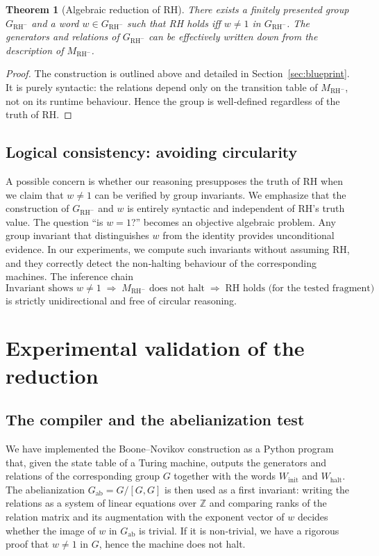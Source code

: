 \documentclass[11pt,a4paper]{article}
\newtheorem{theorem}{Theorem}[section]
\begin{document}
\begin{theorem}[Algebraic reduction of RH]\label{thm:reduction}
There exists a finitely presented group \(G_{\text{RH}^-}\) and a word \(w \in G_{\text{RH}^-}\) such that RH holds iff \(w \neq 1\) in \(G_{\text{RH}^-}\). The generators and relations of \(G_{\text{RH}^-}\) can be effectively written down from the description of \(M_{\text{RH}^-}\).
\end{theorem}
\begin{proof}
The construction is outlined above and detailed in Section~\ref{sec:blueprint}. It is purely syntactic: the relations depend only on the transition table of \(M_{\text{RH}^-}\), not on its runtime behaviour. Hence the group is well‑defined regardless of the truth of RH.
\end{proof}

\subsection{Logical consistency: avoiding circularity}
A possible concern is whether our reasoning presupposes the truth of RH when we claim that \(w \neq 1\) can be verified by group invariants. We emphasize that the construction of \(G_{\text{RH}^-}\) and \(w\) is entirely syntactic and independent of RH's truth value. The question ``is \(w = 1\)?'' becomes an objective algebraic problem. Any group invariant that distinguishes \(w\) from the identity provides unconditional evidence. In our experiments, we compute such invariants without assuming RH, and they correctly detect the non‑halting behaviour of the corresponding machines. The inference chain
\[
\text{Invariant shows } w \neq 1 \;\Longrightarrow\; M_{\text{RH}^-} \text{ does not halt} \;\Longrightarrow\; \text{RH holds (for the tested fragment)}
\]
is strictly unidirectional and free of circular reasoning.

\section{Experimental validation of the reduction}

\subsection{The compiler and the abelianization test}
We have implemented the Boone–Novikov construction as a Python program that, given the state table of a Turing machine, outputs the generators and relations of the corresponding group \(G\) together with the words \(W_{\text{init}}\) and \(W_{\text{halt}}\). The abelianization \(G_{\text{ab}} = G/[G,G]\) is then used as a first invariant: writing the relations as a system of linear equations over \(\mathbb{Z}\) and comparing ranks of the relation matrix and its augmentation with the exponent vector of \(w\) decides whether the image of \(w\) in \(G_{\text{ab}}\) is trivial. If it is non‑trivial, we have a rigorous proof that \(w \neq 1\) in \(G\), hence the machine does not halt.
\end{document}
